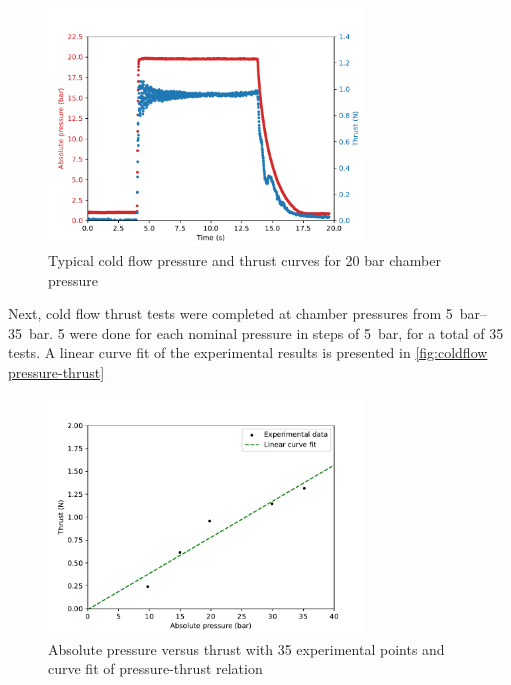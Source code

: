             \begin{figure}[!ht]
                \centering
                \includegraphics[width=0.75\textwidth]{assets/4 experiments/Example thrust 20 bar.pdf}
                \caption{Typical cold flow pressure and thrust curves for 20 bar chamber pressure}
                \label{fig:20bar cold flow}
            \end{figure}
            

            Next, cold flow thrust tests were completed at chamber pressures from \qtyrange{5}{35}{bar}. 5 were done for each nominal pressure in steps of \qty{5}{bar}, for a total of 35 tests. A linear curve fit of the experimental results is presented in \autoref{fig:coldflow pressure-thrust}

            \begin{figure}[!ht]
                \centering
                \includegraphics[width=0.75\textwidth]{assets/4 experiments/pressure-thrust graph.pdf}
                \caption{Absolute pressure versus thrust with 35 experimental points and curve fit of pressure-thrust relation}
                \label{fig:coldflow pressure-thrust}
            \end{figure}


